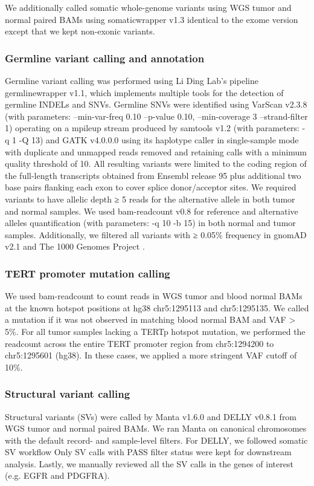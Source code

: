 We additionally called somatic whole-genome variants using WGS tumor and normal paired BAMs using somaticwrapper v1.3 identical to the exome version except that we kept non-exonic variants.

\subsubsection{Germline variant calling and annotation}
Germline variant calling was performed using Li Ding Lab's pipeline germlinewrapper v1.1, which implements multiple tools for the detection of germline INDELs and SNVs. Germline SNVs were identified using VarScan v2.3.8 (with parameters: --min-var-freq 0.10 --p-value 0.10, --min-coverage 3 --strand-filter 1) operating on a mpileup stream produced by samtools v1.2 (with parameters: -q 1 -Q 13) and GATK v4.0.0.0 \cite{mckennaa_depristoma:GenomeAnalysis2010} using its haplotype caller in single-sample mode with duplicate and unmapped reads removed and retaining calls with a minimum quality threshold of 10. All resulting variants were limited to the coding region of the full-length transcripts obtained from Ensembl release 95 plus additional two base pairs flanking each exon to cover splice donor/acceptor sites. We required variants to have allelic depth ≥ 5 reads for the alternative allele in both tumor and normal samples. We used bam-readcount v0.8 for reference and alternative alleles quantification (with parameters: -q 10 -b 15) in both normal and tumor samples. Additionally, we filtered all variants with ≥ 0.05\% frequency in gnomAD v2.1 \cite{karczewskikj_macarthurdg:MutationalConstraint2020} and The 1000 Genomes Project \cite{the1000genomesprojectconsortium:GlobalReference2015}.

\subsubsection{TERT promoter mutation calling}
We used bam-readcount to count reads in WGS tumor and blood normal BAMs at the known hotspot positions at hg38 chr5:1295113 and chr5:1295135. We called a mutation if it was not observed in matching blood normal BAM and VAF > 5\%. For all tumor samples lacking a TERTp hotspot mutation, we performed the readcount across the entire TERT promoter region from chr5:1294200 to chr5:1295601 (hg38). In these cases, we applied a more stringent VAF cutoff of 10\%.


\subsubsection{Structural variant calling}
Structural variants (SVs) were called by Manta v1.6.0 \cite{chenx_saundersct:MantaRapid2016} and DELLY v0.8.1 \cite{rauscht_korbeljo:DELLYStructural2012} from WGS tumor and normal paired BAMs. We ran Manta on canonical chromosomes with the default record- and sample-level filters. For DELLY, we followed somatic SV workflow Only SV calls with PASS filter status were kept for downstream analysis. Lastly, we manually reviewed all the SV calls in the genes of interest (e.g. EGFR and PDGFRA).

